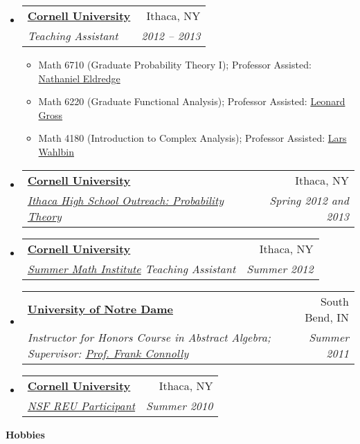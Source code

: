 \documentclass[letterpaper,11pt]{article}
\makeatletter
\newcommand{\resitem}[1]{\item #1 \vspace{-2pt}}
\newcommand{\resheading}[1]{{\large {\textbf{#1 \vphantom{p\^{E}}}}}}
\newenvironment{widetable}[1]
	       {\begin{tabular*}{#1}[t]{l@{\extracolsep{\fill}}r}}
	       {\end{tabular*}}
\newcommand{\ressubheading}[4]{
  \begin{widetable}{\textwidth - 28pt}
		\textbf{#1} & #2 \\
		\textit{#3} & \textit{#4} \\
  \end{widetable}
  \vspace{-12pt}}
\makeatother
\begin{document}
\begin{itemize}
\item
  \ressubheading{\href{http://www.math.cornell.edu}{Cornell University}}
		{Ithaca, NY}
		{Teaching Assistant}
		{2012 -- 2013}
              	\begin{itemize}
		 \resitem{Math 6710 (Graduate
                    Probability Theory I); Professor Assisted: \href{http://www.math.cornell.edu/~neldredge/}{Nathaniel Eldredge}}
                    \resitem{Math 6220 (Graduate Functional Analysis); Professor Assisted: \href{http://www.math.cornell.edu/People/Faculty/grossl.html}{Leonard Gross}}
                     \resitem{Math 4180 (Introduction to Complex Analysis); Professor Assisted: \href{http://www.math.cornell.edu/People/Faculty/wahlbin.html}{Lars Wahlbin}}
		\end{itemize}
				  \item
  \ressubheading{\href{http://www.math.cornell.edu}{Cornell University}}
		{Ithaca, NY}
		{\href{http://www.math.cornell.edu/Community/enrichment.html}{Ithaca High School Outreach: Probability Theory}}
		{Spring 2012 and 2013}
		\item
  \ressubheading{\href{http://www.math.cornell.edu}{Cornell University}}
		{Ithaca, NY}
		{\href{http://www.math.cornell.edu/~smi/}{Summer Math Institute} Teaching Assistant}
		{Summer 2012}
		\item
  \ressubheading{\href{http://www.math.nd.edu}{University of Notre Dame}}
		{South Bend, IN}
		{Instructor for
                    Honors Course in Abstract Algebra; Supervisor: \href{http://math.nd.edu/people/faculty/francis-x-connolly/}{Prof. Frank Connolly}}
		{Summer 2011}
		\item
		  \ressubheading{\href{http://www.math.cornell.edu}{Cornell University}}
		{Ithaca, NY}
		{\href{http://www.math.cornell.edu/~reu/}{NSF REU Participant}}
		{Summer 2010}

\end{itemize}

\resheading{Hobbies}
\end{document}
